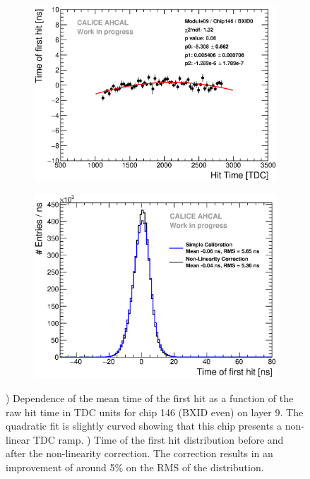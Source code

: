 \documentclass{JINST}
\begin{document}
\begin{figure}[htbp!]
  \begin{subfigure}[t]{0.49\textwidth}
    \centering
    \includegraphics[width=1\linewidth]{fig/LinearityCorrection_Module09_Chip146_BXID0.eps}
    \caption{} \label{fig:NLCorr}
  \end{subfigure}
  \hfill
  \begin{subfigure}[t]{0.49\textwidth}
    \centering
    \includegraphics[width=1\linewidth]{fig/Timing_AHCAL_LinCorrection.eps}
    \caption{} \label{fig:TimingNLCorr}
  \end{subfigure}
  \caption{) Dependence of the mean time of the first hit as a function of the raw hit time in TDC units for chip 146 (BXID even) on layer 9. The quadratic fit is slightly curved showing that this chip presents a non-linear TDC ramp. ) Time of the first hit distribution before and after the non-linearity correction. The correction results in an improvement of around 5\% on the RMS of the distribution.}
\end{figure}
\end{document}
